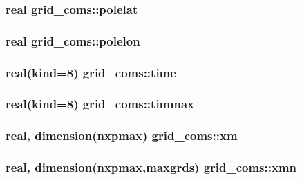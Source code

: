 \subsubsection[{polelat}]{\setlength{\rightskip}{0pt plus 5cm}real grid\+\_\+coms\+::polelat}\label{namespacegrid__coms_a332ff2495f60062e9fa9f90035dc8cd3}
\hypertarget{namespacegrid__coms_ad1ae0e93c1ba39b88b6e957547176e8a}{}
\subsubsection[{polelon}]{\setlength{\rightskip}{0pt plus 5cm}real grid\+\_\+coms\+::polelon}\label{namespacegrid__coms_ad1ae0e93c1ba39b88b6e957547176e8a}
\hypertarget{namespacegrid__coms_a620c7c9f9699aec60464ae63865bd8bc}{}
\subsubsection[{time}]{\setlength{\rightskip}{0pt plus 5cm}real(kind=8) grid\+\_\+coms\+::time}\label{namespacegrid__coms_a620c7c9f9699aec60464ae63865bd8bc}
\hypertarget{namespacegrid__coms_a0d5d3c6d496f754a977e81e980b57006}{}
\subsubsection[{timmax}]{\setlength{\rightskip}{0pt plus 5cm}real(kind=8) grid\+\_\+coms\+::timmax}\label{namespacegrid__coms_a0d5d3c6d496f754a977e81e980b57006}
\hypertarget{namespacegrid__coms_afa5dc0abd71433f8c1e1e42ed0f3f485}{}
\subsubsection[{xm}]{\setlength{\rightskip}{0pt plus 5cm}real, dimension(nxpmax) grid\+\_\+coms\+::xm}\label{namespacegrid__coms_afa5dc0abd71433f8c1e1e42ed0f3f485}
\hypertarget{namespacegrid__coms_aedf16bdd9f6805d93904a372e5f5ac32}{}
\subsubsection[{xmn}]{\setlength{\rightskip}{0pt plus 5cm}real, dimension(nxpmax,maxgrds) grid\+\_\+coms\+::xmn}\label{namespacegrid__coms_aedf16bdd9f6805d93904a372e5f5ac32}
\hypertarget{namespacegrid__coms_ab408e5eee5cb44c67ad1321c400c71ec}{}
